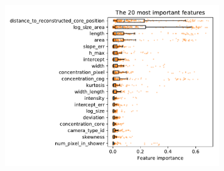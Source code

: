 \documentclass[aspectratio=1610, 9pt]{beamer}
\begin{document}
\begin{frame}
  \includegraphics[width=0.7\textwidth]{../analysis/plots/disp_features.pdf}
\end{frame}
\end{document}
